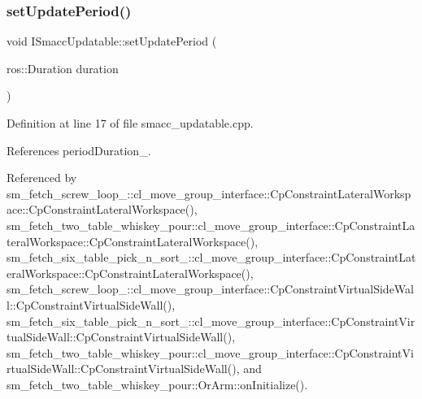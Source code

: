 \subsubsection{\texorpdfstring{set\+Update\+Period()}{setUpdatePeriod()}}
{\footnotesize\ttfamily void I\+Smacc\+Updatable\+::set\+Update\+Period (\begin{DoxyParamCaption}\item[{ros\+::\+Duration}]{duration }\end{DoxyParamCaption})}



Definition at line 17 of file smacc\+\_\+updatable.\+cpp.



References period\+Duration\+\_\+.



Referenced by sm\+\_\+fetch\+\_\+screw\+\_\+loop\+\_\+::cl\+\_\+move\+\_\+group\+\_\+interface\+::\+Cp\+Constraint\+Lateral\+Workspace\+::\+Cp\+Constraint\+Lateral\+Workspace(), sm\+\_\+fetch\+\_\+two\+\_\+table\+\_\+whiskey\+\_\+pour\+::cl\+\_\+move\+\_\+group\+\_\+interface\+::\+Cp\+Constraint\+Lateral\+Workspace\+::\+Cp\+Constraint\+Lateral\+Workspace(), sm\+\_\+fetch\+\_\+six\+\_\+table\+\_\+pick\+\_\+n\+\_\+sort\+\_\+::cl\+\_\+move\+\_\+group\+\_\+interface\+::\+Cp\+Constraint\+Lateral\+Workspace\+::\+Cp\+Constraint\+Lateral\+Workspace(), sm\+\_\+fetch\+\_\+screw\+\_\+loop\+\_\+::cl\+\_\+move\+\_\+group\+\_\+interface\+::\+Cp\+Constraint\+Virtual\+Side\+Wall\+::\+Cp\+Constraint\+Virtual\+Side\+Wall(), sm\+\_\+fetch\+\_\+six\+\_\+table\+\_\+pick\+\_\+n\+\_\+sort\+\_\+::cl\+\_\+move\+\_\+group\+\_\+interface\+::\+Cp\+Constraint\+Virtual\+Side\+Wall\+::\+Cp\+Constraint\+Virtual\+Side\+Wall(), sm\+\_\+fetch\+\_\+two\+\_\+table\+\_\+whiskey\+\_\+pour\+::cl\+\_\+move\+\_\+group\+\_\+interface\+::\+Cp\+Constraint\+Virtual\+Side\+Wall\+::\+Cp\+Constraint\+Virtual\+Side\+Wall(), and sm\+\_\+fetch\+\_\+two\+\_\+table\+\_\+whiskey\+\_\+pour\+::\+Or\+Arm\+::on\+Initialize().


